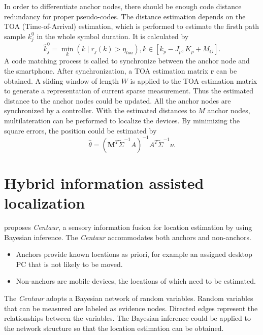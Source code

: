 \documentclass[letterpaper]{article}
\begin{document}
In order to differentiate anchor nodes, there should be enough code distance redundancy for proper pseudo-codes.
The distance estimation depends on the TOA (Time-of-Arrival) estimation, which is performed to estimate the firsth path sample $ k^{0}_{j} $ in the whole symbol duration.
It is calculated by
\begin{equation}
\hat{k}^{0}_{j} = \min_{k} ( k \mid r_{j} (k) > \eta_{toa} ) , k \in [ k_{p} - J_{p}, K_{p} + M_{O}  ].
\end{equation}
A code matching process is called to synchronize between the anchor node and the smartphone.
After synchronization, a TOA estimation matrix $ \mathbf{r} $ can be obtained.
A sliding window of length $ W $  is applied to the TOA estimation matrix to generate a representation of current sparse measurement.
Thus the estimated distance to the anchor nodes could be updated.
All the anchor nodes are synchronized by a controller.
With the estimated distances to $ M $ anchor nodes, multilateration can be performed to localize the devices.	
By minimizing the square errors, the position could be estimated by
\begin{equation}
\hat{\theta} = (\mathbf{M}^{T} \tilde{\Sigma}^{-1} A )^{-1} A^{T} \tilde{\Sigma}^{-1} \nu.
\end{equation}


\section{Hybrid information assisted localization}

\cite{Nandakumar:2012:CLD:2348543.2348579} proposes \emph{Centaur}, a sensory information fusion for location estimation by using Bayesian inference.
The \emph{Centaur} accommodates both anchors and non-anchors.
\begin{itemize}
\item Anchors provide known locations as priori, for example an assigned desktop PC that is not likely to be moved.
\item Non-anchors are mobile devices, the locations of which need to be estimated.
\end{itemize}

The \emph{Centaur} adopts a Bayesian network of random variables.
Random variables that can be measured are labeled as evidence nodes.
Directed edges represent the relationships between the variables.
The Bayesian inference could be applied to the network structure so that the location estimation can be obtained.
\end{document}
